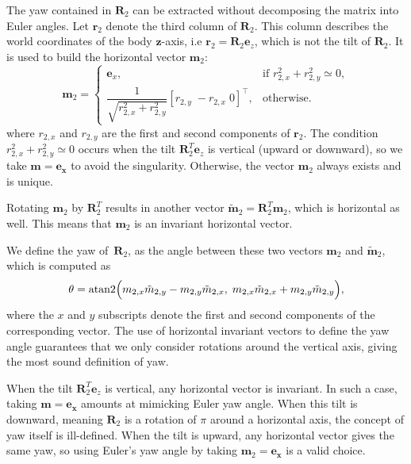 \documentclass{IJCAS}
\begin{document}
The yaw contained in $\boldsymbol{R}_{2}$ can be extracted without decomposing the
matrix into Euler angles.  Let $\boldsymbol{r}_{2}$ denote the third column of $\boldsymbol{R}_{2}$.
This column describes the world coordinates of the body $\boldsymbol{z}$-axis, i.e $\boldsymbol{r}_{2}=\boldsymbol{R}_{2}\boldsymbol{e}_z$, which is not the tilt of $\boldsymbol{R}_{2}$. 
It is used to build the horizontal vector $\boldsymbol{m}_2$:
\begin{equation}
  \scriptstyle{
  \boldsymbol{m}_2
  =
  \begin{cases}
    \boldsymbol{e}_x, &
    \text{if } {r}_{2,x}^{2}+{r}_{2,y}^{2}\simeq0,\\[6pt]
      \dfrac{1}{\sqrt{{r}_{2,x}^{2}+{r}_{2,y}^{2}}} [{r}_{2,y}\;-{r}_{2,x}\;0]^{\top},
    & \text{otherwise.}
  \end{cases}
  }
\end{equation}
where ${r}_{2,x}$ and ${r}_{2,y}$ are the first and second components of $\boldsymbol{r}_{2}$. 
The condition ${r}_{2,x}^{2}+{r}_{2,y}^{2}\simeq0$ occurs when the tilt $\boldsymbol{R}_{2}^T \boldsymbol{e}_z$ is vertical (upward or downward), so we take $\boldsymbol{m}=\boldsymbol{e_x}$ to avoid the singularity.
Otherwise, the vector $\boldsymbol{m}_2$ always exists and is unique.

Rotating $\boldsymbol{m}_2$ by $\boldsymbol{R}_{2}^T$
results in another vector
$\tilde{\boldsymbol{m}}_2=\boldsymbol{R}_{2}^T\boldsymbol{m}_2$, which is horizontal as well.
This means that  $\boldsymbol{m}_2$ is an invariant horizontal vector. 

We define the yaw of~$\boldsymbol{R}_{2}$, as the angle between these two vectors $\boldsymbol{m}_2$ and $\tilde{\boldsymbol{m}}_2$, which is computed as
\begin{equation}
  \theta
  =
  \operatorname{atan2}\Bigl(
     {m}_{2,x}\tilde{{m}}_{2,y}
    -{m}_{2,y}\tilde{{m}}_{2,x},\;
     {m}_{2,x}\tilde{{m}}_{2,x}
    +{m}_{2,y}\tilde{{m}}_{2,y}
  \Bigr),
  \label{eq:yaw_theta}
\end{equation}
where the $x$ and $y$ subscripts denote the first and second components of the corresponding vector. 
The use of horizontal invariant vectors to define the yaw angle guarantees that we only consider rotations around the vertical axis, giving the most sound definition of yaw.

When the tilt $\boldsymbol{R}_{2}^T \boldsymbol{e}_z$ is vertical, any horizontal vector is invariant. In such a case, taking $\boldsymbol{m}=\boldsymbol{e_x}$ amounts at mimicking Euler yaw angle. 
When this tilt is downward, meaning $\boldsymbol{R}_{2}$ is a rotation of $\pi$ around a horizontal axis, the concept of yaw itself is ill-defined. When the tilt is upward, any horizontal vector gives the same yaw, so using Euler's yaw angle by taking  $\boldsymbol{m}_2=\boldsymbol{e_x}$ is a valid choice.
\end{document}

